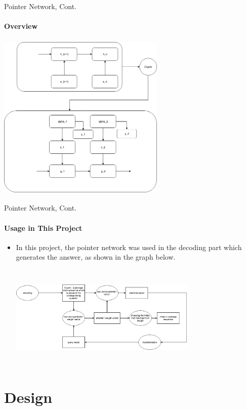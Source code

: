 \documentclass{beamer}
\begin{document}
\begin{frame}{Pointer Network, Cont.}\framesubtitle{Overview}
    \begin{center}
        \includegraphics[width=8cm, height=8cm]{figures/pointerNetwork.png}
    \end{center}

\end{frame}

\begin{frame}{Pointer Network, Cont.}\framesubtitle{Usage in This Project}
    \begin{itemize}
        \item In this project, the pointer network was used in the decoding part which generates the answer, as shown in the graph below.
        \begin{center}
           \includegraphics[width=9cm, height=5cm]{figures/answer_pointer.png}
        \end{center}
    \end{itemize}

\end{frame}

\section{Design}
\end{document}
